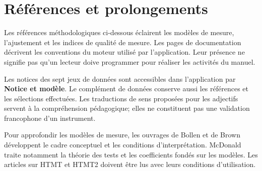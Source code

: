 \documentclass[
  french,
  11pt,
  a4paper,
  DIV=11,
  numbers=noendperiod]{scrreprt}
\begin{document}

\chapter*{Références et
prolongements}\label{ruxe9fuxe9rences-et-prolongements}


Les références méthodologiques ci-dessous éclairent les modèles de
mesure, l'ajustement et les indices de qualité de mesure. Les pages de
documentation décrivent les conventions du moteur utilisé par
l'application. Leur présence ne signifie pas qu'un lecteur doive
programmer pour réaliser les activités du manuel.

Les notices des sept jeux de données sont accessibles dans l'application
par \textbf{Notice et modèle}. Le complément de données conserve aussi
les références et les sélections effectuées. Les traductions de sens
proposées pour les adjectifs servent à la compréhension pédagogique;
elles ne constituent pas une validation francophone d'un instrument.

Pour approfondir les modèles de mesure, les ouvrages de Bollen et de
Brown développent le cadre conceptuel et les conditions
d'interprétation. McDonald traite notamment la théorie des tests et les
coefficients fondés sur les modèles. Les articles sur HTMT et HTMT2
doivent être lus avec leurs conditions d'utilisation.
\end{document}

